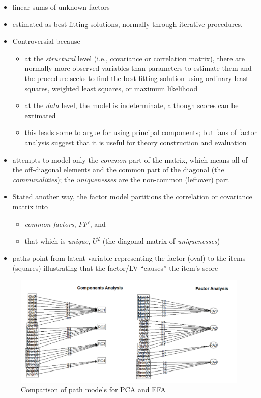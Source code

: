 \documentclass[
  english,
]{book}
\providecommand{\tightlist}{%
  \setlength{\itemsep}{0pt}\setlength{\parskip}{0pt}}
\begin{document}
\begin{itemize}
\tightlist
\item
  linear sums of unknown factors
\item
  estimated as best fitting solutions, normally through iterative procedures.
\item
  Controversial because

  \begin{itemize}
  \tightlist
  \item
    at the \emph{structural} level (i.e., covariance or correlation matrix), there are normally more observed variables than parameters to estimate them and the procedure seeks to find the best fitting solution using ordinary least squares, weighted least squares, or maximum likelihood
  \item
    at the \emph{data} level, the model is indeterminate, although scores can be extimated
  \item
    this leads some to argue for using principal components; but fans of factor analysis suggest that it is useful for theory construction and evaluation
  \end{itemize}
\item
  attempts to model only the \emph{common} part of the matrix, which means all of the off-diagonal elements and the common part of the diagonal (the \emph{communalities}); the \emph{uniquenesses} are the non-common (leftover) part
\item
  Stated another way, the factor model partitions the correlation or covariance matrix into

  \begin{itemize}
  \tightlist
  \item
    \emph{common factors}, \(FF'\), and
  \item
    that which is \emph{unique}, \(U^2\) (the diagonal matrix of \emph{uniquenesses})
  \end{itemize}
\item
  paths point from latent variable representing the factor (oval) to the items (squares) illustrating that the factor/LV ``causes'' the item's score
\end{itemize}

\begin{figure}
\centering
\includegraphics{images/PAF/PCAvPAF.png}
\caption{Comparison of path models for PCA and EFA}
\end{figure}
\end{document}

